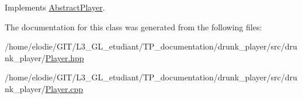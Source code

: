 Implements \hyperlink{classAbstractPlayer_a5c9a863c96224dd297aa44c69010cd94}{Abstract\+Player}.



The documentation for this class was generated from the following files\+:\begin{DoxyCompactItemize}
\item 
/home/elodie/\+G\+I\+T/\+L3\+\_\+\+G\+L\+\_\+etudiant/\+T\+P\+\_\+documentation/drunk\+\_\+player/src/drunk\+\_\+player/\hyperlink{Player_8hpp}{Player.\+hpp}\item 
/home/elodie/\+G\+I\+T/\+L3\+\_\+\+G\+L\+\_\+etudiant/\+T\+P\+\_\+documentation/drunk\+\_\+player/src/drunk\+\_\+player/\hyperlink{Player_8cpp}{Player.\+cpp}\end{DoxyCompactItemize}
